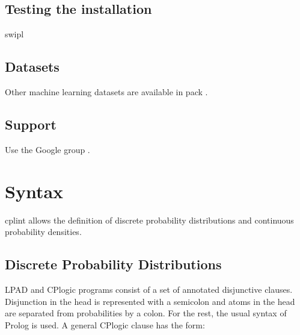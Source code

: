 \documentclass[letterpaper,10pt,english]{sphinxmanual}
\begin{document}
\section{Testing the installation}
\label{\detokenize{index:testing-the-installation}}
\begin{sphinxVerbatim}[commandchars=\\\{\}]
swipl
\end{sphinxVerbatim}


\section{Datasets}
\label{\detokenize{index:datasets}}
\sphinxAtStartPar
Other machine learning datasets are available in pack .


\section{Support}
\label{\detokenize{index:support}}
\sphinxAtStartPar
Use the Google group .


\chapter{Syntax}
\label{\detokenize{index:syntax}}
\sphinxAtStartPar
cplint allows the definition of discrete probability distributions and continuous probability densities.


\section{Discrete Probability Distributions}
\label{\detokenize{index:discrete-probability-distributions}}
\sphinxAtStartPar
LPAD and CP\sphinxhyphen{}logic programs consist of a set of annotated disjunctive clauses.
Disjunction in the head is represented with a semicolon and atoms in the head are separated from probabilities by a colon.
For the rest, the usual syntax of Prolog is used.
A general CP\sphinxhyphen{}logic clause has the form:

\begin{sphinxVerbatim}[commandchars=\\\{\}]
      
\end{sphinxVerbatim}
\end{document}

